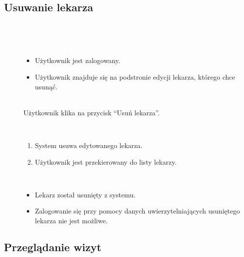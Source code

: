 \documentclass[11pt]{aghdpl}
\begin{document}
\subsection{Usuwanie lekarza}

	\begin{description}
		\item[\useCaseAktor] \hfill \\
			\useCaseUzytkownik
		\item[\useCaseWarPocz] \hfill \\
			\begin{itemize}
				\item Użytkownik jest zalogowany.
				\item Użytkownik znajduje się na podstronie edycji lekarza, którego chce usunąć.
			\end{itemize}
		\item[\useCaseZdarzInicj] \hfill \\
			Użytkownik klika na przycisk ``Usuń lekarza''.
		\item[\useCaseScenBaz] \hfill \\ 
			\begin{enumerate}
				\item System usuwa edytowanego lekarza.
				\item Użytkownik jest przekierowany do listy lekarzy.
			\end{enumerate}
		\item[\useCaseWarKonc] \hfill \\
			\begin{itemize}
				\item Lekarz został usunięty z systemu.
				\item Zalogowanie się przy pomocy danych uwierzytelniających usuniętego lekarza nie jest możliwe.
			\end{itemize}
	\end{description}

\subsection{Przeglądanie wizyt}
	
\end{document}
